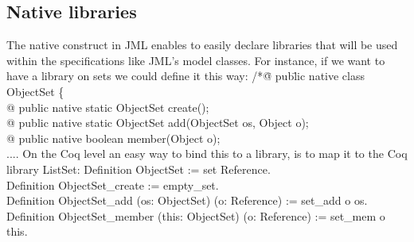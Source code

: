 



\subsection{Native libraries}
The native construct in JML enables to easily declare libraries 
that will be used within the specifications like JML's model classes. 
For instance, if we want to have a library on sets we could define it this way:
\btab
/*\=@ pub\=lic native class ObjectSet \{\+\\
  @\> public native static ObjectSet create();\\
   @\> public native static ObjectSet add(ObjectSet os, Object o);\\
   @\> public native boolean member(Object o);\\
    ....  
\etab
On the Coq level an easy way to bind this to a library, is to map it to the Coq library ListSet:
\btab
Definition ObjectSet := set Reference. \\
Definition ObjectSet\_create := empty\_set.\\
Definition ObjectSet\_add (os: ObjectSet) (o: Reference) :=  set\_add o os.\\
 Definition ObjectSet\_member (this: ObjectSet) (o: Reference) := set\_mem o this.
\etab

